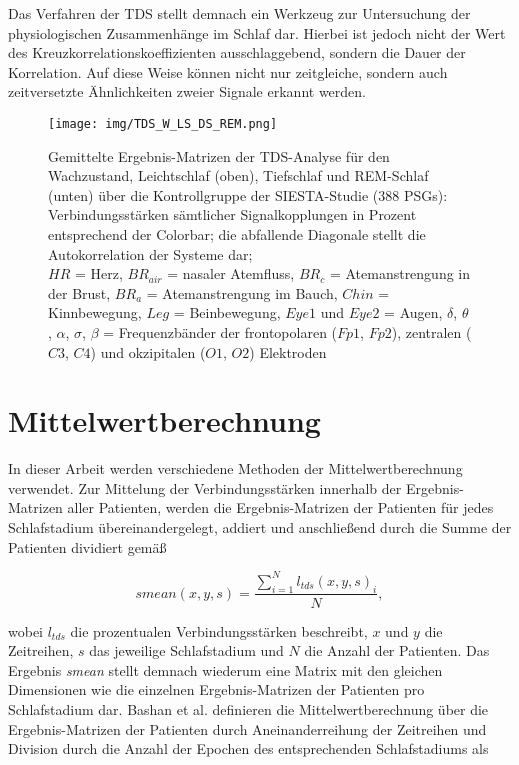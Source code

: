 Das Verfahren der TDS stellt demnach ein Werkzeug zur Untersuchung der physiologischen Zusammenhänge im Schlaf dar. Hierbei ist jedoch nicht der Wert des Kreuzkorrelationskoeffizienten ausschlaggebend, sondern die Dauer der Korrelation. Auf diese Weise können nicht nur zeitgleiche, sondern auch zeitversetzte Ähnlichkeiten zweier Signale erkannt werden. \parencite{bashan_network_2012}

\begin{figure}[H]
	\centering
	\texttt{[image: img/TDS\_W\_LS\_DS\_REM.png]}
	\caption[Ergebnis-Matrizen der \acs{TDS}]{Gemittelte Ergebnis-Matrizen der \acs{TDS}-Analyse für den Wachzustand, Leichtschlaf (oben), Tiefschlaf und \acs{REM}-Schlaf (unten) über die Kontrollgruppe der SIESTA-Studie (388 \acs{PSG}s):\\Verbindungsstärken sämtlicher Signalkopplungen in Prozent entsprechend der Colorbar; die abfallende Diagonale stellt die Autokorrelation der Systeme dar;\\$HR$ = Herz, $BR_{air}$ = nasaler Atemfluss, $BR_c$ = Atemanstrengung in der Brust, $BR_a$ = Atemanstrengung im Bauch, $Chin$ = Kinnbewegung, $Leg$ = Beinbewegung, $Eye1$ und $Eye2$ = Augen, $\delta$, $\theta$, $\alpha$, $\sigma$, $\beta$ = Frequenzbänder der frontopolaren ($Fp1$, $Fp2$), zentralen ($C3$, $C4$) und okzipitalen ($O1$, $O2$) Elektroden}
	\label{fig:TDS_Matrizen}
\end{figure}

\newpage

\section{Mittelwertberechnung}\label{calcmean}

In dieser Arbeit werden verschiedene Methoden der Mittelwertberechnung verwendet. Zur Mittelung der Verbindungsstärken innerhalb der Ergebnis-Matrizen aller Patienten, werden die Ergebnis-Matrizen der Patienten für jedes Schlafstadium übereinandergelegt, addiert und anschließend durch die Summe der Patienten dividiert gemäß

\begin{equation}
smean(x,y,s) = \frac{\sum \limits_{i=1}^N l_{tds}(x,y,s)_i}{N},
	\label{eq:smean}
\end{equation}

wobei $l_{tds}$ die prozentualen Verbindungsstärken beschreibt, $x$ und $y$ die Zeitreihen, $s$ das jeweilige Schlafstadium und $N$ die Anzahl der Patienten. Das Ergebnis \textit{smean} stellt demnach wiederum eine Matrix mit den gleichen Dimensionen wie die einzelnen Ergebnis-Matrizen der Patienten pro Schlafstadium dar. Bashan et al. definieren die Mittelwertberechnung über die Ergebnis-Matrizen der Patienten durch Aneinanderreihung der Zeitreihen und Division durch die Anzahl der Epochen des entsprechenden Schlafstadiums als 

